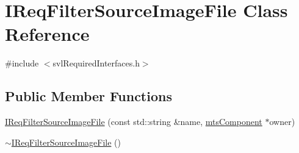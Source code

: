 \hypertarget{class_i_req_filter_source_image_file}{}\section{I\+Req\+Filter\+Source\+Image\+File Class Reference}
\label{class_i_req_filter_source_image_file}


{\ttfamily \#include $<$svl\+Required\+Interfaces.\+h$>$}

\subsection*{Public Member Functions}
\begin{DoxyCompactItemize}
\item 
\hyperlink{class_i_req_filter_source_image_file_a9996644ef89b3a71d11ca36eb54be98d}{I\+Req\+Filter\+Source\+Image\+File} (const std\+::string \&name, \hyperlink{classmts_component}{mts\+Component} $\ast$owner)
\item 
\hyperlink{class_i_req_filter_source_image_file_a6446f1b47eef8bbf21f44d7b9e31e587}{$\sim$\+I\+Req\+Filter\+Source\+Image\+File} ()
\end{DoxyCompactItemize}
